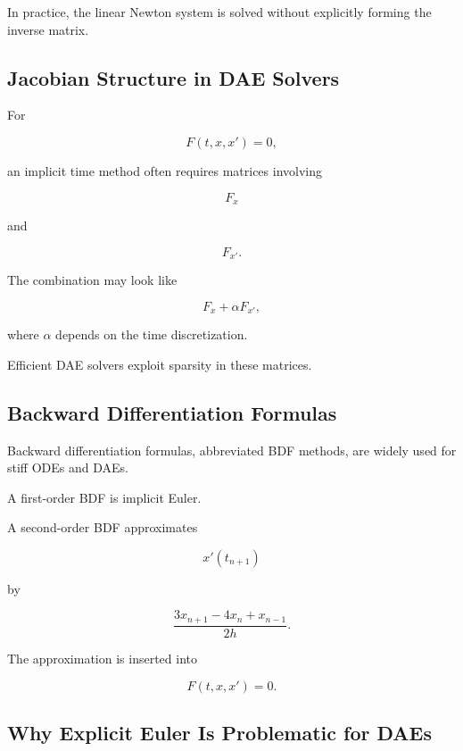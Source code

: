 In practice, the linear Newton system is solved without explicitly forming
the inverse matrix.

\subsection{Jacobian Structure in DAE Solvers}
\label{subsec:dae-jacobian-structure}

For

\[
F(t,x,x')=0,
\]

an implicit time method often requires matrices involving

\[
\boxed{
F_x
}
\]

and

\[
\boxed{
F_{x'}.
}
\]

The combination may look like

\[
\boxed{
F_x
+
\alpha
F_{x'},
}
\]

where \(\alpha\) depends on the time discretization.

Efficient DAE solvers exploit sparsity in these matrices.

\subsection{Backward Differentiation Formulas}
\label{subsec:bdf-daes}

Backward differentiation formulas, abbreviated BDF methods, are widely
used for stiff ODEs and DAEs.

A first-order BDF is implicit Euler.

A second-order BDF approximates

\[
x'(t_{n+1})
\]

by

\[
\boxed{
\frac{
3x_{n+1}
-
4x_n
+
x_{n-1}
}{
2h
}.
}
\]

The approximation is inserted into

\[
F(t,x,x')=0.
\]

\subsection{Why Explicit Euler Is Problematic for DAEs}
\label{subsec:explicit-euler-dae-problem}

